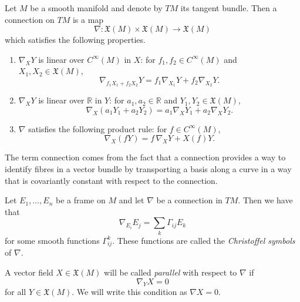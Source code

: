 \begin{definition}
    Let $M$ be a smooth manifold and denote by $TM$ its tangent bundle. Then a connection on $TM$ is a map
    $$
        \nabla : \mathfrak{X}(M) \times \mathfrak{X}(M) \to \mathfrak{X}(M)
    $$
    which satisfies the following properties.
    \begin{enumerate}
        \renewcommand{\labelenumi}{\roman{enumi})}

        \item $\nabla_X Y$ is linear over $C^\infty(M)$ in $X$: for
              $f_1,f_2 \in C^\infty(M)$ and $X_1,X_2 \in \mathfrak{X}(M)$,
              \[
                  \nabla_{f_1X_1+f_2X_2}Y
                  =
                  f_1\nabla_{X_1}Y+f_2\nabla_{X_2}Y.
              \]

        \item $\nabla_X Y$ is linear over $\mathbb{R}$ in $Y$: for
              $a_1,a_2 \in \mathbb{R}$ and $Y_1,Y_2 \in \mathfrak{X}(M)$,
              \[
                  \nabla_X(a_1Y_1+a_2Y_2)
                  =
                  a_1\nabla_XY_1+a_2\nabla_XY_2.
              \]

        \item $\nabla$ satisfies the following product rule: for
              $f \in C^\infty(M)$,
              \[
                  \nabla_X(fY)
                  =
                  f\,\nabla_XY+X(f)Y.
              \]

    \end{enumerate}
\end{definition}
\begin{remark}
    The term connection comes from the fact that a connection provides a
    way to identify fibres in a vector bundle by transporting a basis along
    a curve in a way that is covariantly constant with respect to the connection.
\end{remark}
\begin{definition}
    Let $E_1, \dots , E_n$ be a frame on $M$ and let $\nabla$ be a connection in $TM$. Then we have that
    $$
        \nabla_{E_i}E_j = \sum_k \Gamma_{ij} E_k
    $$
    for some smooth functions $\Gamma_{ij}^k$. These functions are called the \emph{Christoffel symbols} of $\nabla$.
\end{definition}
\begin{definition}
    A vector field $X \in \mathfrak{X}(M)$ will be called \emph{parallel} with respect to $\nabla$ if
    $$\nabla_Y X =0$$
    for all $Y \in \mathfrak{X}(M)$. We will write this condition as $\nabla X = 0$.
\end{definition}

